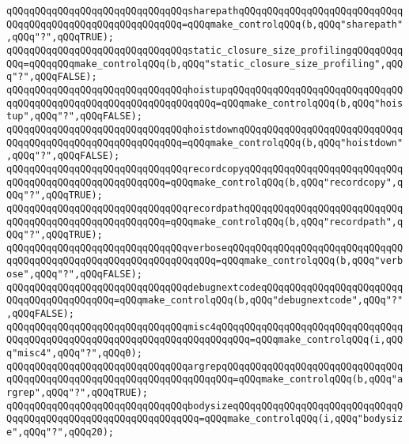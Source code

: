 \verb|qQQqqQQqqQQqqQQqqQQqqQQqqQQqqQQqsharepathqQQqqQQqqQQqqQQqqQQqqQQqqQQqqQQqqQQqqQQqqQQqqQQqqQQqqQQqqQQq=qQQqmake_controlqQQq(b,qQQq"sharepath",qQQq"?",qQQqTRUE);|\newline
\newline
\verb|qQQqqQQqqQQqqQQqqQQqqQQqqQQqqQQqstatic_closure_size_profilingqQQqqQQqqQQq=qQQqqQQqmake_controlqQQq(b,qQQq"static_closure_size_profiling",qQQq"?",qQQqFALSE);|\newline
\newline
\verb|qQQqqQQqqQQqqQQqqQQqqQQqqQQqqQQqhoistupqQQqqQQqqQQqqQQqqQQqqQQqqQQqqQQqqQQqqQQqqQQqqQQqqQQqqQQqqQQqqQQqqQQq=qQQqmake_controlqQQq(b,qQQq"hoistup",qQQq"?",qQQqFALSE);|\newline
\verb|qQQqqQQqqQQqqQQqqQQqqQQqqQQqqQQqhoistdownqQQqqQQqqQQqqQQqqQQqqQQqqQQqqQQqqQQqqQQqqQQqqQQqqQQqqQQqqQQq=qQQqmake_controlqQQq(b,qQQq"hoistdown",qQQq"?",qQQqFALSE);|\newline
\newline
\verb|qQQqqQQqqQQqqQQqqQQqqQQqqQQqqQQqrecordcopyqQQqqQQqqQQqqQQqqQQqqQQqqQQqqQQqqQQqqQQqqQQqqQQqqQQqqQQq=qQQqmake_controlqQQq(b,qQQq"recordcopy",qQQq"?",qQQqTRUE);|\newline
\verb|qQQqqQQqqQQqqQQqqQQqqQQqqQQqqQQqrecordpathqQQqqQQqqQQqqQQqqQQqqQQqqQQqqQQqqQQqqQQqqQQqqQQqqQQqqQQq=qQQqmake_controlqQQq(b,qQQq"recordpath",qQQq"?",qQQqTRUE);|\newline
\newline
\verb|qQQqqQQqqQQqqQQqqQQqqQQqqQQqqQQqverboseqQQqqQQqqQQqqQQqqQQqqQQqqQQqqQQqqQQqqQQqqQQqqQQqqQQqqQQqqQQqqQQqqQQq=qQQqmake_controlqQQq(b,qQQq"verbose",qQQq"?",qQQqFALSE);|\newline
\verb|qQQqqQQqqQQqqQQqqQQqqQQqqQQqqQQqdebugnextcodeqQQqqQQqqQQqqQQqqQQqqQQqqQQqqQQqqQQqqQQqqQQq=qQQqmake_controlqQQq(b,qQQq"debugnextcode",qQQq"?",qQQqFALSE);|\newline
\verb|qQQqqQQqqQQqqQQqqQQqqQQqqQQqqQQqmisc4qQQqqQQqqQQqqQQqqQQqqQQqqQQqqQQqqQQqqQQqqQQqqQQqqQQqqQQqqQQqqQQqqQQqqQQqqQQq=qQQqmake_controlqQQq(i,qQQq"misc4",qQQq"?",qQQq0);|\newline
\newline
\verb|qQQqqQQqqQQqqQQqqQQqqQQqqQQqqQQqargrepqQQqqQQqqQQqqQQqqQQqqQQqqQQqqQQqqQQqqQQqqQQqqQQqqQQqqQQqqQQqqQQqqQQqqQQq=qQQqmake_controlqQQq(b,qQQq"argrep",qQQq"?",qQQqTRUE);|\newline
\verb|qQQqqQQqqQQqqQQqqQQqqQQqqQQqqQQqbodysizeqQQqqQQqqQQqqQQqqQQqqQQqqQQqqQQqqQQqqQQqqQQqqQQqqQQqqQQqqQQqqQQq=qQQqmake_controlqQQq(i,qQQq"bodysize",qQQq"?",qQQq20);|\newline
